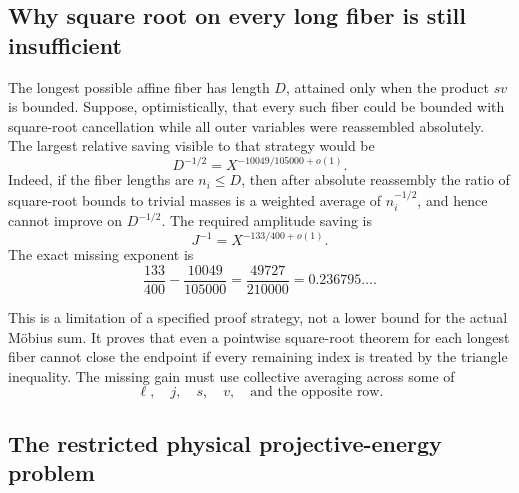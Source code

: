 \subsection{Why square root on every long fiber is still insufficient}

The longest possible affine fiber has length \(D\), attained only when the
product \(sv\) is bounded.  Suppose, optimistically, that every such fiber
could be bounded with square-root cancellation while all outer variables
were reassembled absolutely.  The largest relative saving visible to that
strategy would be
\begin{equation}
 D^{-1/2}
 =X^{-10049/105000+o(1)}.
 \label{eq:tpc33-single-fiber-sqrt-saving}
\end{equation}
Indeed, if the fiber lengths are \(n_i\le D\), then after absolute
reassembly the ratio of square-root bounds to trivial masses is a weighted
average of \(n_i^{-1/2}\), and hence cannot improve on \(D^{-1/2}\).
The required amplitude saving is
\begin{equation}
 J^{-1}=X^{-133/400+o(1)}.
 \label{eq:tpc33-required-J-saving}
\end{equation}
The exact missing exponent is
\begin{equation}
 \boxed{
 \frac{133}{400}-\frac{10049}{105000}
 =\frac{49727}{210000}
 =0.236795\ldots.}
 \label{eq:tpc33-single-fiber-gap}
\end{equation}

This is a limitation of a specified proof strategy, not a lower bound for
the actual M\"obius sum.  It proves that even a pointwise square-root theorem
for each longest fiber cannot close the endpoint if every remaining index
is treated by the triangle inequality.  The missing gain must use collective
averaging across some of
\begin{equation}
 \ell,\quad j,\quad s,\quad v,\quad
 \text{and the opposite row}.
 \label{eq:tpc33-outer-average-variables}
\end{equation}

\subsection{The restricted physical projective-energy problem}

